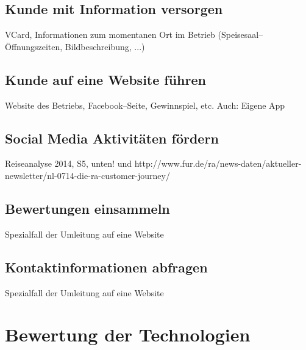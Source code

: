 \subsection{Kunde mit Information versorgen} %
\label{sub:kunde_mit_information_versorgen}
VCard, Informationen zum momentanen Ort im Betrieb (Speisesaal--Öffnungszeiten, Bildbeschreibung, ...)


\subsection{Kunde auf eine Website führen} %
\label{sub:kunde_auf_eine_website_fuhren}
Website des Betriebs, Facebook--Seite, Gewinnspiel, etc.
Auch: Eigene App

\subsection{Social Media Aktivitäten fördern} %
\label{sub:social_media_aktivitaten_fordern}
Reiseanalyse 2014, S5, unten! und http://www.fur.de/ra/news-daten/aktueller-newsletter/nl-0714-die-ra-customer-journey/ 

\subsection{Bewertungen einsammeln} %
\label{sub:bewertungen_einsammeln}
Spezialfall der Umleitung auf eine Website


\subsection{Kontaktinformationen abfragen} %
\label{sub:kontaktinformationen_abfragen}
Spezialfall der Umleitung auf eine Website


\newpage
\section{Bewertung der Technologien} %
\label{sec:bewertung}


